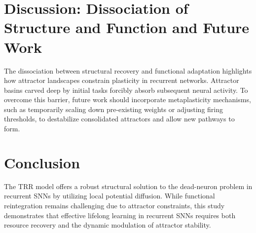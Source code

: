 \documentclass{article}
\begin{document}
\section{Discussion: Dissociation of Structure and Function and Future Work}
The dissociation between structural recovery and functional adaptation highlights how attractor landscapes constrain plasticity in recurrent networks. Attractor basins carved deep by initial tasks forcibly absorb subsequent neural activity. To overcome this barrier, future work should incorporate metaplasticity mechanisms, such as temporarily scaling down pre-existing weights or adjusting firing thresholds, to destabilize consolidated attractors and allow new pathways to form.

\section{Conclusion}
The TRR model offers a robust structural solution to the dead-neuron problem in recurrent SNNs by utilizing local potential diffusion. While functional reintegration remains challenging due to attractor constraints, this study demonstrates that effective lifelong learning in recurrent SNNs requires both resource recovery and the dynamic modulation of attractor stability.



\end{document}
